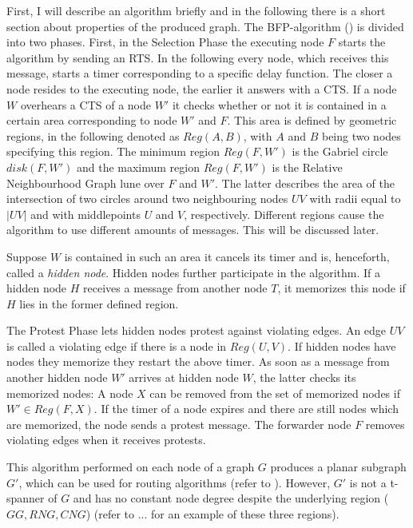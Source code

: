 First, I will describe an algorithm briefly and in the following there is a short section about properties of the produced graph.
The BFP-algorithm (\cite{Ruhrup2010}) is divided into two phases.
First, in the Selection Phase the executing node $F $ starts the algorithm by sending an RTS. 
In the following every node, which receives this message, starts a timer corresponding to a specific delay function.
The closer a node resides to the executing node, the earlier it answers with a CTS. 
If a node $W $ overhears a CTS of a node $W' $ it checks whether or not it is contained in a certain area corresponding to node $W' $ and $F $.
This area is defined by geometric regions, in the following denoted as $Reg(A, B) $, with $A $ and $B $ being two nodes specifying this region.
The minimum region $Reg(F, W') $ is the Gabriel circle $disk(F, W') $ and the maximum region $Reg(F, W') $ is the Relative Neighbourhood Graph lune over $F $ and $W' $.
The latter describes the area of the intersection of two circles around two neighbouring nodes $UV $ with radii equal to $|UV| $ and with middlepoints $U $ and $V $, respectively.
Different regions cause the algorithm to use different amounts of messages.
This will be discussed later.

Suppose $W $ is contained in such an area it cancels its timer and is, henceforth, called a \emph{hidden node}.
Hidden nodes further participate in the algorithm.
If a hidden node $H $ receives a message from another node $T $, it memorizes this node if $H $ lies in the former defined region. 

The Protest Phase lets hidden nodes protest against violating edges.
An edge $UV $ is called a violating edge if there is a node in $Reg(U, V) $.
If hidden nodes have nodes they memorize they restart the above timer.
As soon as a message from another hidden node $W' $ arrives at hidden node $W $, the latter checks its memorized nodes:
A node $X $ can be removed from the set of memorized nodes if $W' \in Reg(F,X) $.
If the timer of a node expires and there are still nodes which are memorized, the node sends a protest message.
The forwarder node $F $ removes violating edges when it receives protests.

This algorithm performed on each node of a graph $G $ produces a planar subgraph $G' $, which can be used for routing algorithms (refer to \cite{Ruhrup2010}).
However, $G' $ is not a t-spanner of $G $ and has no constant node degree despite the underlying region ($GG, RNG, CNG $) (refer to ... for an example of these three regions).

